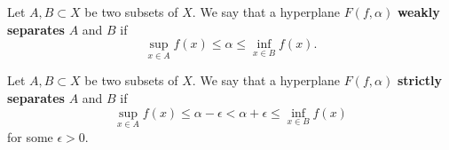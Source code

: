 \begin{definition}
    Let $A,B\subset X$ be two subsets of $X$. We say that a hyperplane $F(f,\alpha)$ 
    \textbf{weakly separates} $A$ and $B$ if 
    \begin{equation*}
        \sup_{x\in A} f(x) \leq \alpha \leq \inf_{x\in B} f(x).
    \end{equation*}
\end{definition}

\begin{definition}
    Let $A,B\subset X$ be two subsets of $X$. We say that a hyperplane $F(f,\alpha)$ 
    \textbf{strictly separates} $A$ and $B$ if 
    \begin{equation*}
        \sup_{x\in A} f(x) \leq \alpha - \epsilon < \alpha + \epsilon \leq \inf_{x\in B} f(x)
    \end{equation*}
    for some $\epsilon > 0$.
\end{definition}

